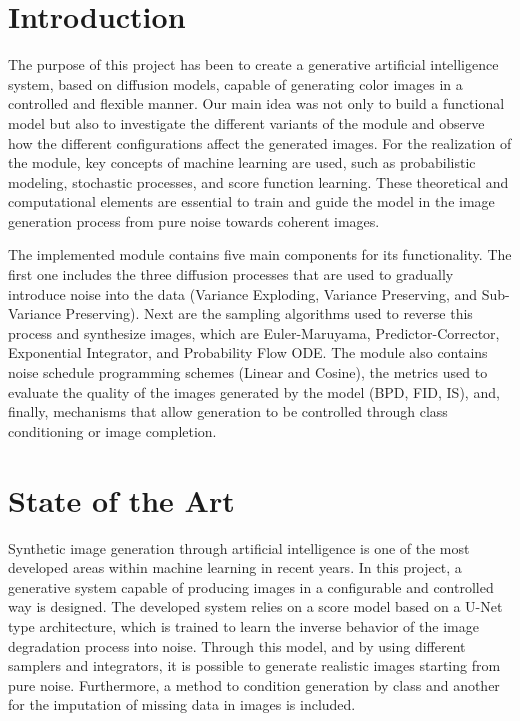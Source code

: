 \documentclass[11pt,a4paper]{article}
\begin{document}
\tableofcontents
\newpage

\section{Introduction}
The purpose of this project has been to create a generative artificial intelligence system, based on diffusion models, capable of generating color images in a controlled and flexible manner. Our main idea was not only to build a functional model but also to investigate the different variants of the module and observe how the different configurations affect the generated images. For the realization of the module, key concepts of machine learning are used, such as probabilistic modeling, stochastic processes, and score function learning. These theoretical and computational elements are essential to train and guide the model in the image generation process from pure noise towards coherent images.

The implemented module contains five main components for its functionality. The first one includes the three diffusion processes that are used to gradually introduce noise into the data (Variance Exploding, Variance Preserving, and Sub-Variance Preserving). Next are the sampling algorithms used to reverse this process and synthesize images, which are Euler-Maruyama, Predictor-Corrector, Exponential Integrator, and Probability Flow ODE. The module also contains noise schedule programming schemes (Linear and Cosine), the metrics used to evaluate the quality of the images generated by the model (BPD, FID, IS), and, finally, mechanisms that allow generation to be controlled through class conditioning or image completion.

\section{State of the Art}
Synthetic image generation through artificial intelligence is one of the most developed areas within machine learning in recent years. In this project, a generative system capable of producing images in a configurable and controlled way is designed. The developed system relies on a score model based on a U-Net type architecture, which is trained to learn the inverse behavior of the image degradation process into noise. Through this model, and by using different samplers and integrators, it is possible to generate realistic images starting from pure noise. Furthermore, a method to condition generation by class and another for the imputation of missing data in images is included.
\end{document}
